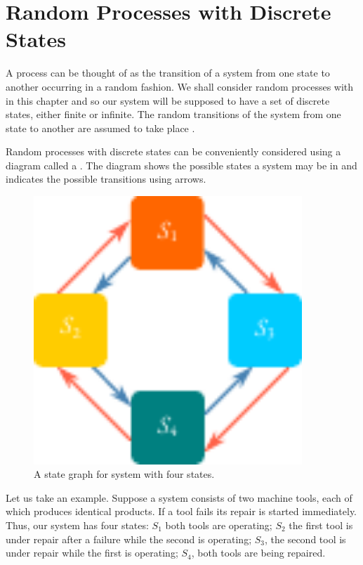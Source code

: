 \section{Random Processes with Discrete States}
A  process can be thought of as the transition of a system from
one state to another occurring in a random fashion. We shall consider
random processes with  in this chapter and so our system
will be supposed to have a set of discrete states, either finite or infinite.
The random transitions of the system from one state to another are
assumed to take place .

 Random processes with discrete states can be
conveniently considered using a diagram called a . The
diagram shows the possible states a system may be in and indicates the
possible transitions using arrows.
 \begin{figure}%
 \centering
 \includegraphics[width=0.9\textwidth]{figures/state-graph1.pdf}
\caption{A state graph for system with four states.}
\label{state-graph1}
 \end{figure}
 
Let us take an example. Suppose a system consists of two machine
tools, each of which produces identical products. If a tool fails its repair
is started immediately. Thus, our system has four states: $S_{1}$ both tools
are operating; $S_{2}$ the first tool is under repair after a failure while the
second is operating; $S_{3}$, the second tool is under repair while the first is
operating; $S_{4}$, both tools are being repaired.

